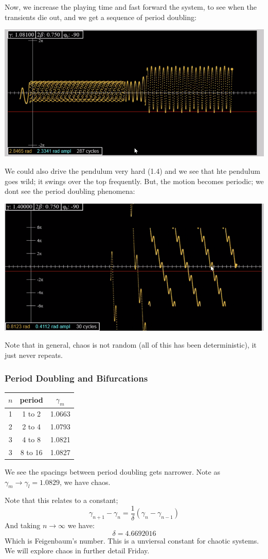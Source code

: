 Now, we increase the playing time and fast forward the system, to see when the transients die out, and we get a sequence of period doubling:
\begin{center}
    \includegraphics[scale=0.5]{Lecture-32/l32-img7.png}
\end{center}
We could also drive the pendulum very hard (1.4) and we see that hte pendulum goes wild; it swings over the top frequently. But, the motion becomes periodic; we dont see the period doubling phenomena:
\begin{center}
    \includegraphics[scale=0.5]{Lecture-32/l32-img8.png}
\end{center}
Note that in general, chaos is not random (all of this has been deterministic), it just never repeats.

\subsubsection{Period Doubling and Bifurcations}
\begin{center}
\begin{tabular}{c|c|c}
    $n$ & period & $\gamma_m$ \\ 
    \hline
    1 & 1 to 2 & 1.0663 \\
    2 & 2 to 4 & 1.0793 \\
    3 & 4 to 8 & 1.0821 \\
    3 & 8 to 16 & 1.0827 \\
\end{tabular}
\end{center}

We see the spacings between period doubling gets narrower. Note as $\gamma_m \rightarrow \gamma_l = 1.0829$, we have chaos.

Note that this relates to a constant;
\[\gamma_{n+1} - \gamma_n = \frac{1}{\delta}(\gamma_n - \gamma_{n-1})\]
And taking $n \rightarrow \infty$ we have:
\[\delta = 4.6692016\]
Which is Feigenbaum's number. This is a unviersal constant for chaotic systems. We will explore chaos in further detail Friday.